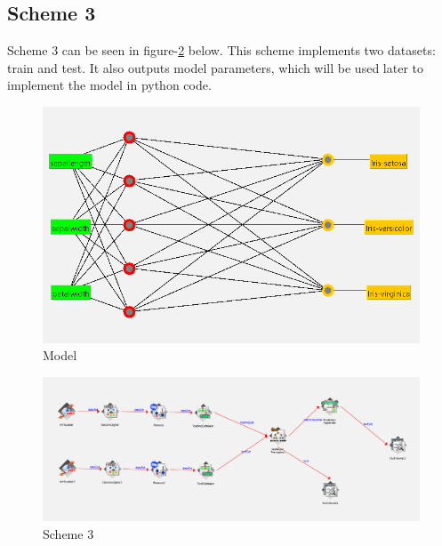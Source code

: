 \documentclass{article}
\begin{document}
\subsection*{Scheme 3}
Scheme 3 can be seen in figure-\ref{fig:scheme-3} below. This scheme implements two datasets: train and test. It also outputs model parameters, which will be used later to implement the model in python code.
\begin{figure}[H]
    \centering
    \includegraphics[width=1\textwidth]{model.png}
    \caption{Model}
    \label{fig:model}
\end{figure}
\begin{figure}[H]
    \centering
    \includegraphics[width=1\textwidth]{config-3.png}
    \caption{Scheme 3}
    \label{fig:scheme-3}
\end{figure}
\end{document}
